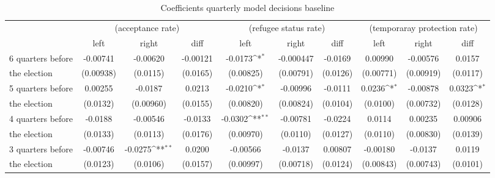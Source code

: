 \begin{table}[!ht]\centering \scriptsize
	\def\sym#1{\ifmmode^{#1}\else\(^{#1}\)\fi}
	\caption{Coefficients quarterly model decisions baseline}
	\begin{tabular}{l*{9}{c}}
		\hline\hline
		&\multicolumn{3}{c}{(acceptance rate)}&\multicolumn{3}{c}{(refugee status rate)}&\multicolumn{3}{c}{(temporaray protection rate)}\\
		&\multicolumn{1}{c}{left}&\multicolumn{1}{c}{right}&\multicolumn{1}{c}{diff}&\multicolumn{1}{c}{left}&\multicolumn{1}{c}{right}&\multicolumn{1}{c}{diff}&\multicolumn{1}{c}{left}&\multicolumn{1}{c}{right}&\multicolumn{1}{c}{diff}\\
\hline
 6 quarters before &    -0.00741         &    -0.00620         &    -0.00121         &     -0.0173\sym{*}  &   -0.000447         &     -0.0169         &     0.00990         &    -0.00576         &      0.0157         \\
the election                    &   (0.00938)         &    (0.0115)         &    (0.0165)         &   (0.00825)         &   (0.00791)         &    (0.0126)         &   (0.00771)         &   (0.00919)         &    (0.0117)         \\
[1em]
 5 quarters before &     0.00255         &     -0.0187         &      0.0213         &     -0.0210\sym{*}  &    -0.00996         &     -0.0111         &      0.0236\sym{*}  &    -0.00878         &      0.0323\sym{*}  \\
 the election                   &    (0.0132)         &   (0.00960)         &    (0.0155)         &   (0.00820)         &   (0.00824)         &    (0.0104)         &    (0.0100)         &   (0.00732)         &    (0.0128)         \\
[1em]
 4 quarters before &     -0.0188         &    -0.00546         &     -0.0133         &     -0.0302\sym{**} &    -0.00781         &     -0.0224         &      0.0114         &     0.00235         &     0.00906         \\
the election                    &    (0.0133)         &    (0.0113)         &    (0.0176)         &   (0.00970)         &    (0.0110)         &    (0.0127)         &    (0.0110)         &   (0.00830)         &    (0.0139)         \\
[1em]
 3 quarters before &    -0.00746         &     -0.0275\sym{**} &      0.0200         &    -0.00566         &     -0.0137         &     0.00807         &    -0.00180         &     -0.0137         &      0.0119         \\
the election                    &    (0.0123)         &    (0.0106)         &    (0.0157)         &   (0.00997)         &   (0.00718)         &    (0.0124)         &   (0.00843)         &   (0.00743)         &    (0.0101)         \\

\end{tabular}
\end{table}
